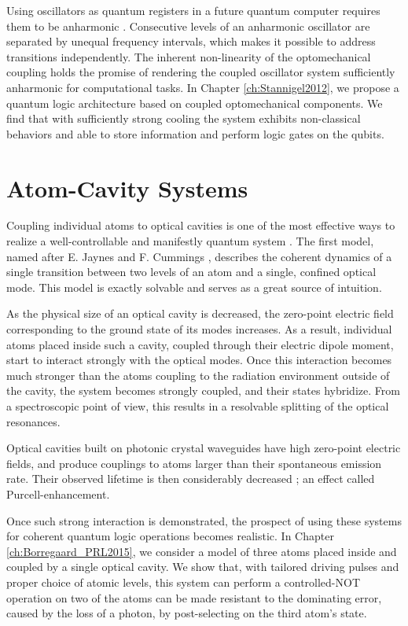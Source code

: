 Using oscillators as quantum registers in a future quantum computer requires
them to be anharmonic \cite{Majer2007}. Consecutive levels of an
anharmonic oscillator are separated by unequal frequency intervals, which makes
it possible to address transitions independently. The inherent
non-linearity of the optomechanical coupling holds the promise of rendering the
coupled oscillator system sufficiently anharmonic for computational tasks. In
Chapter \ref{ch:Stannigel2012}, we propose a quantum logic architecture based on
coupled optomechanical components. We find that with sufficiently strong cooling
the system exhibits non-classical behaviors and able to store information and
perform logic gates on the qubits.






\section{Atom-Cavity Systems}
Coupling individual atoms to optical cavities is one of the most effective ways
to realize a well-controllable and manifestly quantum system \cite{Mabuchi2002,
Walther2006}.
The first model, named after E. Jaynes and F. Cummings \cite{Jaynes1963,
Shore1993}, describes the coherent dynamics of a single transition between two
levels of an atom and a single, confined optical mode. This model is exactly
solvable and serves as a great source of intuition.

As the physical size of an optical cavity is decreased, the zero-point
electric field corresponding to the ground state of its modes increases.
As a result, individual atoms placed inside such a cavity, coupled through their
electric dipole moment, start to interact strongly with the optical modes. Once
this interaction becomes much stronger than the atoms coupling to the radiation
environment outside of the cavity, the system becomes strongly coupled, and
their states hybridize. From a spectroscopic point of view, this results in a
resolvable splitting of the optical resonances.

Optical cavities built on photonic crystal waveguides \cite{Tiecke} have
high zero-point electric fields, and produce couplings
to atoms larger than their spontaneous emission rate. Their
observed lifetime is then considerably decreased \cite{Englund2005}; an effect
called Purcell-enhancement.

Once such strong interaction is demonstrated, the prospect of using these
systems for coherent quantum logic operations becomes realistic. In Chapter
\ref{ch:Borregaard_PRL2015}, we consider a model of three atoms placed inside
and coupled by a single optical cavity. We show that, with tailored driving pulses
and proper choice of atomic levels, this system can perform a controlled-NOT
operation on two of the atoms can be made resistant to the dominating error,
caused by the loss of a photon, by post-selecting on the third atom's
state.

